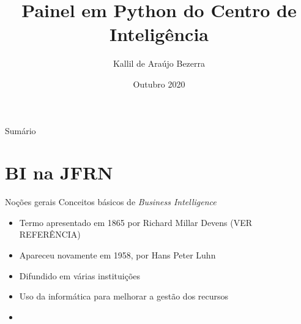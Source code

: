 \documentclass[10pt,t]{beamer}
\title[Heverlee \LaTeX\ Beamer theme]{Painel em Python do Centro de Inteligência}
\author{Kallil de Araújo Bezerra}
\institute{Universidade Federal do Rio Grande do Norte}
\date{Outubro 2020}
\begin{document}

{


\begin{frame}
    \titlepage
\end{frame}
}		


\begin{frame}{Sumário}
	\vskip 2mm
	\hfill	{\large \parbox{.95\textwidth}{\tableofcontents[hideothersubsections]}}
\end{frame}



\section{BI na JFRN}

\begin{frame}{Noções gerais}\label{colorpalette}
\vspace{8pt}
Conceitos básicos de \textit{Business Intelligence}
    \begin{itemize}
        \item Termo apresentado em 1865 por Richard Millar Devens (VER REFERÊNCIA)
        \item Apareceu novamente em 1958, por Hans Peter Luhn
    	\item Difundido em várias instituições
    	\item Uso da informática para melhorar a gestão dos recursos
    	\item 
    \end{itemize}
\end{frame} 
\end{document}
